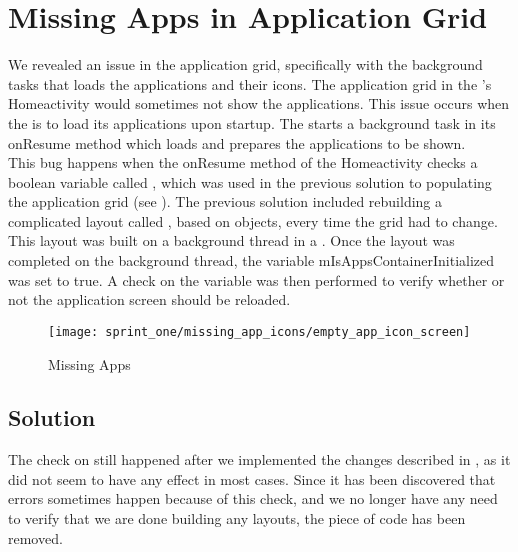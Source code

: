 
\section{Missing Apps in Application Grid}
\label{sec:missing_apps_racecondition}

We revealed an issue in the application grid, specifically with the background tasks that loads the applications and their icons. The application grid in the \launcher's Homeactivity would sometimes not show the applications. This issue occurs when the \launcher is to load its applications upon startup. The \launcher starts a background task in its onResume method which loads and prepares the applications to be shown.\\

This bug happens when the onResume method of the Homeactivity checks a boolean variable called , which was used in the previous solution to populating the application grid (see ). The previous solution included rebuilding a complicated layout called , based on  objects, every time the grid had to change. This layout was built on a background thread in a . Once the layout was completed on the background thread, the variable mIsAppsContainerInitialized was set to true. A check on the variable was then performed to verify whether or not the application screen should be reloaded.

\begin{figure}[!htbp]
    \centering
    \texttt{[image: sprint\_one/missing\_app\_icons/empty\_app\_icon\_screen]}
    \caption{Missing Apps}
    \label{fig:missing_apps}
\end{figure}

\subsection{Solution}
\label{sub:missing_apps_racecondition_solution}

The check on  still happened after we implemented the changes described in , as it did not seem to have any effect in most cases. Since it has been discovered that errors sometimes happen because of this check, and we no longer have any need to verify that we are done building any layouts, the piece of code has been removed. 